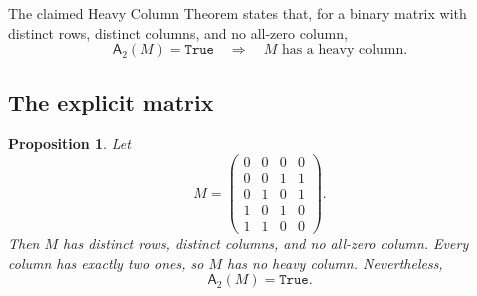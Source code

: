\documentclass[11pt]{amsart}
\newtheorem{proposition}[theorem]{Proposition}
\theoremstyle{definition}
\theoremstyle{remark}
\newcommand{\Aalg}{\mathsf A_2}
\newcommand{\True}{\texttt{True}}
\begin{document}
The claimed Heavy Column Theorem states that, for a binary matrix with distinct rows, distinct columns, and no all-zero column,
\[
  \Aalg(M)=\True \quad\Longrightarrow\quad M\text{ has a heavy column}.
\]

\subsection{The explicit matrix}

\begin{proposition}\label{prop:a2-counterexample}
Let
\[
M=
\begin{pmatrix}
0&0&0&0\\
0&0&1&1\\
0&1&0&1\\
1&0&1&0\\
1&1&0&0
\end{pmatrix}.
\]
Then $M$ has distinct rows, distinct columns, and no all-zero column. Every column has exactly two ones, so $M$ has no heavy column. Nevertheless,
\[
  \Aalg(M)=\True.
\]
\end{proposition}
\end{document}
